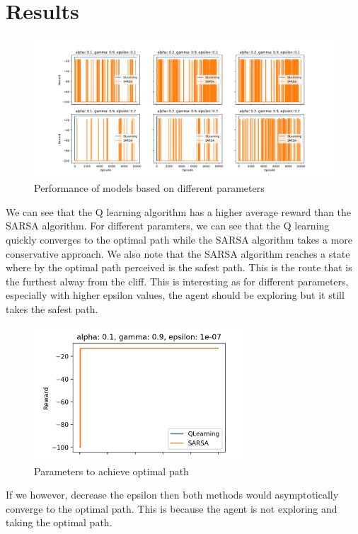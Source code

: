 \documentclass{article}
\begin{document}
\section*{Results}

\begin{figure}[h]
    \includegraphics[width=15cm]{image-3.png}
    \caption{Performance of models based on different parameters}
\end{figure}

We can see that the Q learning algorithm has a higher average reward than the
SARSA algorithm. For different paramters, we can see that the Q learning
quickly converges to the optimal path while the SARSA algorithm takes a more
conservative approach. We also note that the SARSA algorithm reaches a state
where by the optimal path perceived is the safest path. This is the route that
is the furthest alway from the cliff. This is interesting as for different
parameters, especially with higher epsilon values, the agent should be exploring
but it still takes the safest path.

\begin{figure}[h]
    \centering
    \includegraphics[width=0.7\textwidth]{image-4.png}
    \caption{Parameters to achieve optimal path}
\end{figure}

If we however, decrease the epsilon then both methods would asymptotically
converge to the optimal path. This is because the agent is not exploring and
taking the optimal path.
\end{document}
